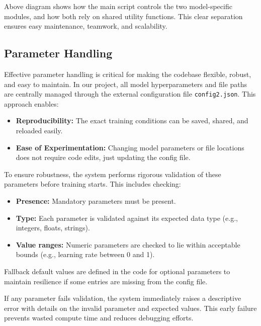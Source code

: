 Above diagram shows how the main script controls the two model-specific modules, and how both rely on shared utility functions. This clear separation ensures easy maintenance, teamwork, and scalability.


\subsection{Parameter Handling}

Effective parameter handling is critical for making the codebase flexible, robust, and easy to maintain. In our project, all model hyperparameters and file paths are centrally managed through the external configuration file \texttt{config2.json}. This approach enables:

\begin{itemize}
	\item \textbf{Reproducibility:} The exact training conditions can be saved, shared, and reloaded easily.
	\item \textbf{Ease of Experimentation:} Changing model parameters or file locations does not require code edits, just updating the config file.
\end{itemize}

To ensure robustness, the system performs rigorous validation of these parameters before training starts. This includes checking:

\begin{itemize}
	\item \textbf{Presence:} Mandatory parameters must be present.
	\item \textbf{Type:} Each parameter is validated against its expected data type (e.g., integers, floats, strings).
	\item \textbf{Value ranges:} Numeric parameters are checked to lie within acceptable bounds (e.g., learning rate between 0 and 1).
\end{itemize}

Fallback default values are defined in the code for optional parameters to maintain resilience if some entries are missing from the config file.

If any parameter fails validation, the system immediately raises a descriptive error with details on the invalid parameter and expected values. This early failure prevents wasted compute time and reduces debugging efforts.

\vspace{0.5em}
\noindent





